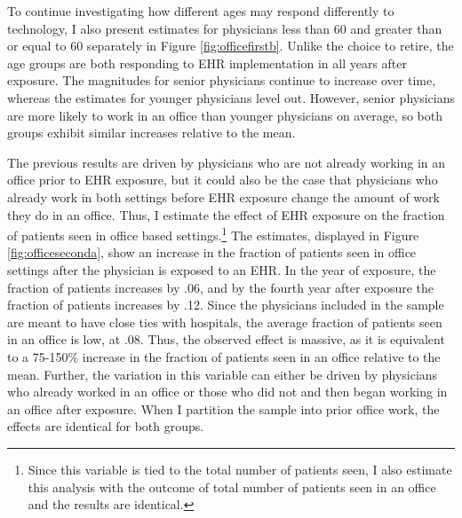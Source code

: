 \documentclass[12pt]{article}
\begin{document}
To continue investigating how different ages may respond differently to technology, I also present estimates for physicians less than 60 and greater than or equal to 60 separately in Figure \ref{fig:officefirstb}. Unlike the choice to retire, the age groups are both responding to EHR implementation in all years after exposure. The magnitudes for senior physicians continue to increase over time, whereas the estimates for younger physicians level out. However, senior physicians are more likely to work in an office than younger physicians on average, so both groups exhibit similar increases relative to the mean. 

The previous results are driven by physicians who are not already working in an office prior to EHR exposure, but it could also be the case that physicians who already work in both settings before EHR exposure change the amount of work they do in an office. Thus, I estimate the effect of EHR exposure on the fraction of patients seen in office based settings.\footnote{Since this variable is tied to the total number of patients seen, I also estimate this analysis with the outcome of total number of patients seen in an office and the results are identical.} The estimates, displayed in Figure \ref{fig:officeseconda}, show an increase in the fraction of patients seen in office settings after the physician is exposed to an EHR. In the year of exposure, the fraction of patients increases by .06, and by the fourth year after exposure the fraction of patients increases by .12. Since the physicians included in the sample are meant to have close ties with hospitals, the average fraction of patients seen in an office is low, at .08. Thus, the observed effect is massive, as it is equivalent to a 75-150\% increase in the fraction of patients seen in an office relative to the mean. Further, the variation in this variable can either be driven by physicians who already worked in an office or those who did not and then began working in an office after exposure. When I partition the sample into prior office work, the effects are identical for both groups. 
\end{document}
